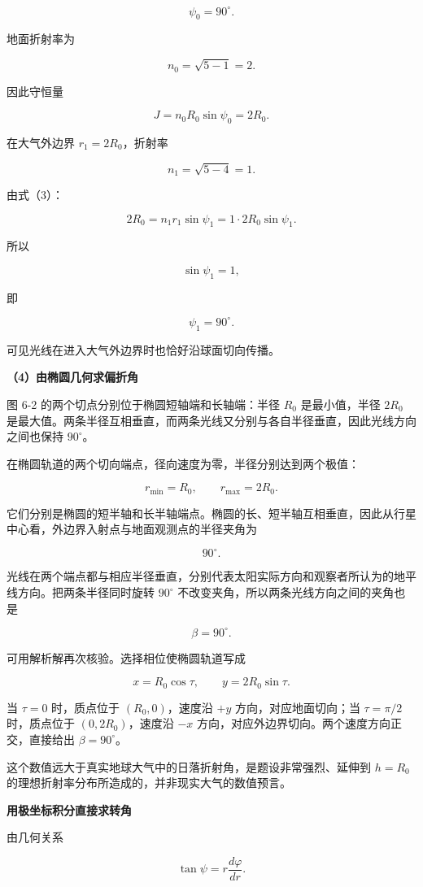 \documentclass[12pt,a4paper,UTF8]{ctexart}
\begin{document}
\[
\psi_0=90^\circ.
\]

地面折射率为

\[
n_0=\sqrt{5-1}=2.
\]

因此守恒量

\[
J=n_0R_0\sin\psi_0=2R_0.
\tag{9}
\]

在大气外边界 \(r_1=2R_0\)，折射率

\[
n_1=\sqrt{5-4}=1.
\]

由式（3）：

\[
2R_0=n_1r_1\sin\psi_1
=1\cdot2R_0\sin\psi_1.
\]

所以

\[
\sin\psi_1=1,
\]

即

\[
\psi_1=90^\circ.
\tag{10}
\]

可见光线在进入大气外边界时也恰好沿球面切向传播。

\textbf{（4）由椭圆几何求偏折角}

图 6-2 的两个切点分别位于椭圆短轴端和长轴端：半径 \(R_0\) 是最小值，半径
\(2R_0\)
是最大值。两条半径互相垂直，而两条光线又分别与各自半径垂直，因此光线方向之间也保持
\(90^\circ\)。

在椭圆轨道的两个切向端点，径向速度为零，半径分别达到两个极值：

\[
r_{\min}=R_0,
\qquad
r_{\max}=2R_0.
\]

它们分别是椭圆的短半轴和长半轴端点。椭圆的长、短半轴互相垂直，因此从行星中心看，外边界入射点与地面观测点的半径夹角为

\[
90^\circ.
\]

光线在两个端点都与相应半径垂直，分别代表太阳实际方向和观察者所认为的地平线方向。把两条半径同时旋转
\(90^\circ\) 不改变夹角，所以两条光线方向之间的夹角也是

\[
\boxed{\beta=90^\circ}.
\tag{11}
\]

可用解析解再次核验。选择相位使椭圆轨道写成

\[
x=R_0\cos\tau,
\qquad
y=2R_0\sin\tau.
\]

当 \(\tau=0\) 时，质点位于 \((R_0,0)\)，速度沿 \(+y\)
方向，对应地面切向；当 \(\tau=\pi/2\) 时，质点位于 \((0,2R_0)\)，速度沿
\(-x\) 方向，对应外边界切向。两个速度方向正交，直接给出
\(\beta=90^\circ\)。

这个数值远大于真实地球大气中的日落折射角，是题设非常强烈、延伸到
\(h=R_0\) 的理想折射率分布所造成的，并非现实大气的数值预言。

\textbf{用极坐标积分直接求转角}

由几何关系

\[
\tan\psi=r\frac{d\varphi}{dr}.
\]
\end{document}

